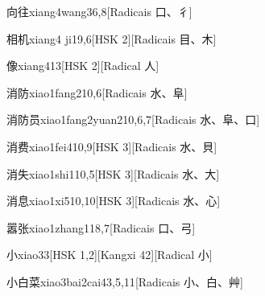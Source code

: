 \begin{entry}{向往}{xiang4wang3}{6,8}[Radicais ⼝、⼻]
\end{entry}

\begin{entry}{相机}{xiang4 ji1}{9,6}[HSK 2][Radicais ⽬、⽊]
\end{entry}

\begin{entry}{像}{xiang4}{13}[HSK 2][Radical ⼈]
\end{entry}

\begin{entry}{消防}{xiao1fang2}{10,6}[Radicais ⽔、⾩]
\end{entry}

\begin{entry}{消防员}{xiao1fang2yuan2}{10,6,7}[Radicais ⽔、⾩、⼝]
\end{entry}

\begin{entry}{消费}{xiao1fei4}{10,9}[HSK 3][Radicais ⽔、⾙]
\end{entry}

\begin{entry}{消失}{xiao1shi1}{10,5}[HSK 3][Radicais ⽔、⼤]
\end{entry}

\begin{entry}{消息}{xiao1xi5}{10,10}[HSK 3][Radicais ⽔、⼼]
\end{entry}

\begin{entry}{嚣张}{xiao1zhang1}{18,7}[Radicais ⼝、⼸]
\end{entry}

\begin{entry}{小}{xiao3}{3}[HSK 1,2][Kangxi 42][Radical ⼩]
\end{entry}

\begin{entry}{小白菜}{xiao3bai2cai4}{3,5,11}[Radicais ⼩、⽩、⾋]
\end{entry}


